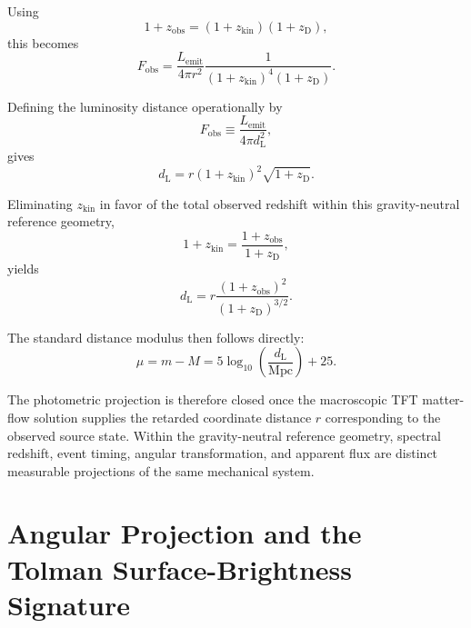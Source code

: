 Using
\begin{equation}
    1+z_{\mathrm{obs}}
    =
    (1+z_{\mathrm{kin}})
    (1+z_{\mathrm D}),
\end{equation}
this becomes
\begin{equation}
    F_{\mathrm{obs}}
    =
    \frac{L_{\mathrm{emit}}}{4\pi r^2}
    \frac{1}{
        (1+z_{\mathrm{kin}})^4
        (1+z_{\mathrm D})
    }.
\end{equation}

Defining the luminosity distance operationally by
\begin{equation}
    F_{\mathrm{obs}}
    \equiv
    \frac{L_{\mathrm{emit}}}{4\pi d_{\mathrm L}^2},
\end{equation}
gives
\begin{equation}
    d_{\mathrm L}
    =
    r
    (1+z_{\mathrm{kin}})^2
    \sqrt{1+z_{\mathrm D}}.
\end{equation}

Eliminating $z_{\mathrm{kin}}$ in favor of the total observed redshift within this gravity-neutral reference geometry,
\begin{equation}
    1+z_{\mathrm{kin}}
    =
    \frac{1+z_{\mathrm{obs}}}{1+z_{\mathrm D}},
\end{equation}
yields
\begin{equation}
    d_{\mathrm L}
    =
    r
    \frac{
        (1+z_{\mathrm{obs}})^2
    }{
        (1+z_{\mathrm D})^{3/2}
    }.
\end{equation}

The standard distance modulus then follows directly:
\begin{equation}
    \mu
    =
    m-M
    =
    5\log_{10}
    \left(
        \frac{d_{\mathrm L}}{\mathrm{Mpc}}
    \right)
    +
    25.
\end{equation}

The photometric projection is therefore closed once the macroscopic TFT matter-flow solution supplies the retarded coordinate distance $r$ corresponding to the observed source state. Within the gravity-neutral reference geometry, spectral redshift, event timing, angular transformation, and apparent flux are distinct measurable projections of the same mechanical system.


\section{Angular Projection and the Tolman Surface-Brightness Signature}
\label{sec:angular_diameter_turnover}

